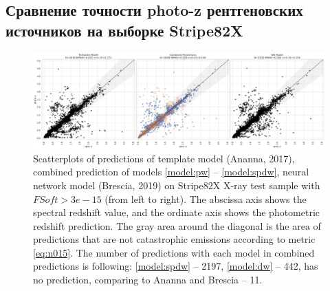 \documentclass[fleqn,usenatbib]{mnras}
\begin{document}
\subsection{Сравнение точности photo-z рентгеновских источников на выборке Stripe82X}\label{ssec:sota-comp}

\begin{figure}
    \centering
    \includegraphics[width=0.9\linewidth]{images/stripe82x-sota35-colored_final.png}
    \caption{Scatterplots of predictions of template model (Ananna, 2017), combined prediction of models \ref{model:pw} -- \ref{model:spdw}, neural network model (Brescia, 2019) on Stripe82X X-ray test sample with $FSoft > 3e-15$ (from left to right). The abscissa axis shows the spectral redshift value, and the ordinate axis shows the photometric redshift prediction. The gray area around the diagonal is the area of predictions that are not catastrophic emissions according to metric \eqref{eq:n015}. The number of predictions with each model in combined predictions is following: \ref{model:spdw} -- 2197, \ref{model:dw} -- 442, has no prediction, comparing to Ananna and Brescia -- 11.}
    \label{fig:scatter-s82x-sota35}
\end{figure}
\end{document}
